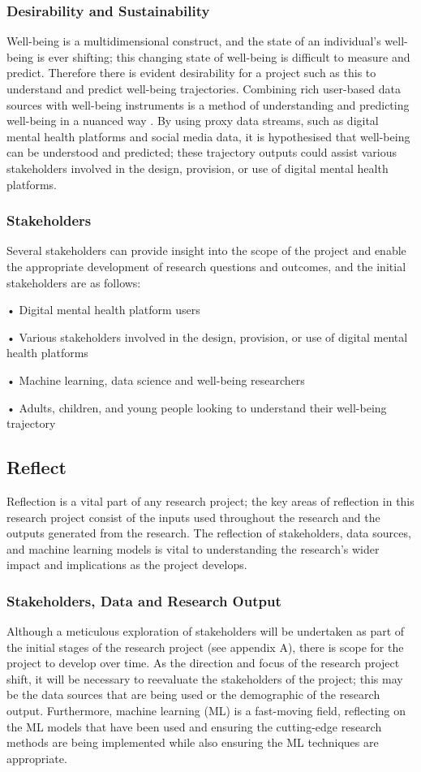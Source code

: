 \documentclass[12pt]{article}
\begin{document}
\subsubsection{Desirability and Sustainability}
Well-being is a multidimensional construct, and the state of an individual's well-being is ever shifting; this changing state of well-being is difficult to measure and predict. Therefore there is evident desirability for a project such as this to understand and predict well-being trajectories. Combining rich user-based data sources with well-being instruments is a method of understanding and predicting well-being in a nuanced way \parencite{jaidka_estimating_2020}. By using proxy data streams, such as digital mental health platforms and social media data, it is hypothesised that well-being can be understood and predicted; these trajectory outputs could assist various stakeholders involved in the design, provision, or use of digital mental health platforms.

\subsubsection{Stakeholders}
Several stakeholders can provide insight into the scope of the project and enable the appropriate development of research questions and outcomes, and the initial stakeholders are as follows:

•	Digital mental health platform users

•	Various stakeholders involved in the design, provision, or use of digital mental health platforms

•	Machine learning, data science and well-being researchers

•	Adults, children, and young people looking to understand their well-being trajectory

\subsection{Reflect}
Reflection is a vital part of any research project; the key areas of reflection in this research project consist of the inputs used throughout the research and the outputs generated from the research. The reflection of stakeholders, data sources, and machine learning models is vital to understanding the research's wider impact and implications as the project develops.

\subsubsection{Stakeholders, Data and Research Output}
Although a meticulous exploration of stakeholders will be undertaken as part of the initial stages of the research project (see appendix A), there is scope for the project to develop over time. As the direction and focus of the research project shift, it will be necessary to reevaluate the stakeholders of the project; this may be the data sources that are being used or the demographic of the research output. Furthermore, machine learning (ML) is a fast-moving field, reflecting on the ML models that have been used and ensuring the cutting-edge research methods are being implemented while also ensuring the ML techniques are appropriate. 
\end{document}
